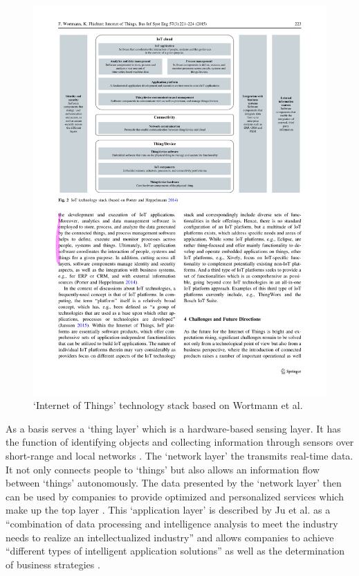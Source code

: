 	\begin{figure}[ht]
	    \begin{center}
	    \includegraphics[scale=0.66]{Talk11/wortmann_stack.pdf}
	    \end{center}
	    \caption{`Internet of Things' technology stack based on Wortmann et al. \cite{wortmann}}
	    \label{fig:wortmann_stack}
    \end{figure}
	
	As a basis serves a `thing layer' which is a hardware-based sensing layer. It has the function of identifying objects and collecting information through sensors over short-range and local networks \cite{ju}. The `network layer' the transmits real-time data. It not only connects people to `things' but also allows an information flow between `things' autonomously. The data presented by the `network layer' then can be used by companies to provide optimized and personalized services which make up the top layer \cite{ju}. This `application layer' is described by Ju et al. as a ``combination of data processing and intelligence analysis to meet the industry needs to realize an intellectualized industry'' \cite[p. 883]{ju} and allows companies to achieve ``different types of intelligent application solutions'' as well as the determination of business strategies \cite[p. 884]{ju}.

